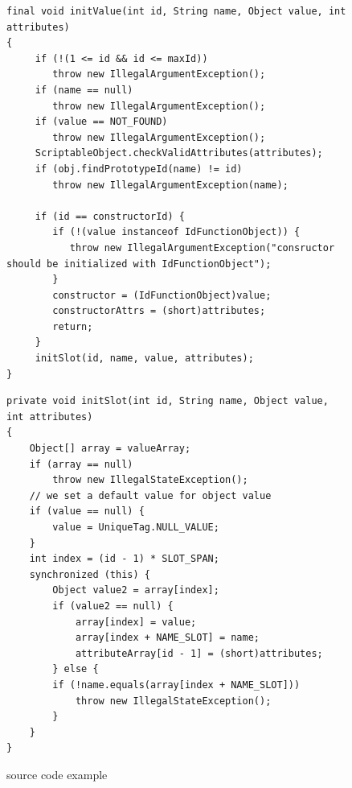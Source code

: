\begin{figure}[ht]

\begin{lstlisting}
final void initValue(int id, String name, Object value, int attributes)
{
     if (!(1 <= id && id <= maxId))
        throw new IllegalArgumentException();
     if (name == null)
        throw new IllegalArgumentException();
     if (value == NOT_FOUND)
        throw new IllegalArgumentException();
     ScriptableObject.checkValidAttributes(attributes);
     if (obj.findPrototypeId(name) != id)
        throw new IllegalArgumentException(name);

     if (id == constructorId) {
        if (!(value instanceof IdFunctionObject)) {
           throw new IllegalArgumentException("consructor should be initialized with IdFunctionObject");
        }
        constructor = (IdFunctionObject)value;
        constructorAttrs = (short)attributes;
        return;
     }
     initSlot(id, name, value, attributes);
}
\end{lstlisting}

\begin{lstlisting}
private void initSlot(int id, String name, Object value, int attributes)
{
    Object[] array = valueArray;
    if (array == null)
        throw new IllegalStateException();
    // we set a default value for object value
    if (value == null) {
        value = UniqueTag.NULL_VALUE;
    }
    int index = (id - 1) * SLOT_SPAN;
    synchronized (this) {
        Object value2 = array[index];
        if (value2 == null) {
            array[index] = value;
            array[index + NAME_SLOT] = name;
            attributeArray[id - 1] = (short)attributes;
        } else {
        if (!name.equals(array[index + NAME_SLOT]))
            throw new IllegalStateException();
        }
    }
}
\end{lstlisting}

 \caption{\label{figure:sourceCodeExample}source code example}
\end{figure}




